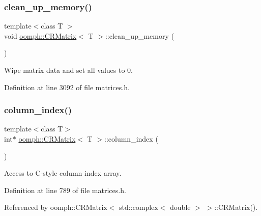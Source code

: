 \subsubsection{\texorpdfstring{clean\+\_\+up\+\_\+memory()}{clean\_up\_memory()}}
{\footnotesize\ttfamily template$<$class T $>$ \\
void \hyperlink{classoomph_1_1CRMatrix}{oomph\+::\+C\+R\+Matrix}$<$ T $>$\+::clean\+\_\+up\+\_\+memory (\begin{DoxyParamCaption}{ }\end{DoxyParamCaption})}



Wipe matrix data and set all values to 0. 



Definition at line 3092 of file matrices.\+h.

\mbox{\label{classoomph_1_1CRMatrix_aa6057d1c2a9a491f643e0633c778f8fb}} 
\subsubsection{\texorpdfstring{column\+\_\+index()}{column\_index()}\hspace{0.1cm}{\footnotesize\ttfamily [1/2]}}
{\footnotesize\ttfamily template$<$class T$>$ \\
int$\ast$ \hyperlink{classoomph_1_1CRMatrix}{oomph\+::\+C\+R\+Matrix}$<$ T $>$\+::column\+\_\+index (\begin{DoxyParamCaption}{ }\end{DoxyParamCaption})\hspace{0.3cm}{\ttfamily [inline]}}



Access to C-\/style column index array. 



Definition at line 789 of file matrices.\+h.



Referenced by oomph\+::\+C\+R\+Matrix$<$ std\+::complex$<$ double $>$ $>$\+::\+C\+R\+Matrix().

\mbox{\label{classoomph_1_1CRMatrix_a278c99924c90c8eaccc7c325685a3dc7}} 
